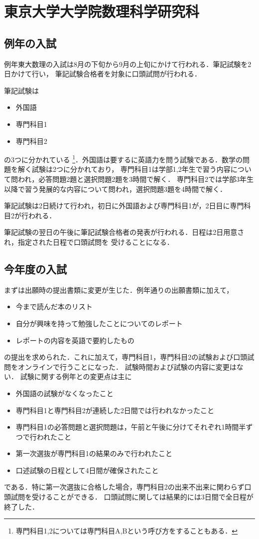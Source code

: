 \documentclass[uplatex]{jsarticle}
\begin{document}
\newpage
\section*{東京大学大学院数理科学研究科}
\subsection*{例年の入試}
例年東大数理の入試は8月の下旬から9月の上旬にかけて行われる．筆記試験を2日かけて行い，
筆記試験合格者を対象に口頭試問が行われる．

筆記試験は
\begin{itemize}
  \item 外国語
  \item 専門科目1
  \item 専門科目2
\end{itemize}
の3つに分かれている
\footnote{
  専門科目1,2については専門科目A,Bという呼び方をすることもある．
}．外国語は要するに英語力を問う試験である．数学の問題を解く試験は2つに分かれており，
専門科目1は学部1,2年生で習う内容について問われ，必答問題2題と選択問題2題を3時間で解く．
専門科目2では学部3年生以降で習う発展的な内容について問われ，選択問題3題を4時間で解く．

筆記試験は2日続けて行われ，初日に外国語および専門科目1が，2日目に専門科目2が行われる．

筆記試験の翌日の午後に筆記試験合格者の発表が行われる．日程は2日用意され，指定された日程で口頭試問を
受けることになる．

\subsection*{今年度の入試}
まずは出願時の提出書類に変更が生じた．例年通りの出願書類に加えて，
\begin{itemize}
  \item 今まで読んだ本のリスト
  \item 自分が興味を持って勉強したことについてのレポート
  \item レポートの内容を英語で要約したもの
\end{itemize}
の提出を求められた．これに加えて，専門科目1，専門科目2の試験および口頭試問をオンラインで行うことになった．
試験時間および試験の内容に変更はない．
試験に関する例年との変更点は主に
\begin{itemize}
  \item 外国語の試験がなくなったこと
  \item 専門科目1と専門科目2が連続した2日間では行われなかったこと
  \item 専門科目1の必答問題と選択問題は，午前と午後に分けてそれぞれ1時間半ずつで行われたこと
  \item 第一次選抜が専門科目1の結果のみで行われたこと
  \item 口述試験の日程として4日間が確保されたこと
\end{itemize}
である．特に第一次選抜に合格した場合，専門科目2の出来不出来に関わらず口頭試問を受けることができる．
口頭試問に関しては結果的には3日間で全日程が終了した．
\end{document}
